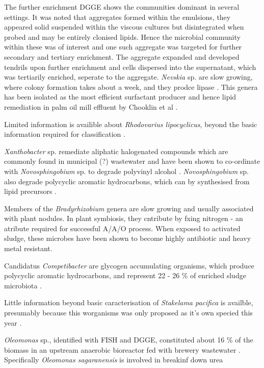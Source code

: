 \documentclass[11pt]{article}
\begin{document}
The further enrichment DGGE shows the communities dominant in several settings. It was noted that aggregates formed within the emulsions, they appeared solid suspended within the viscous cultures but disintegrated when probed and may be entirely clonised lipids. Hence the microbial community within these was of interest and one such aggregate was targeted for further secondary and tertiary enrichment. The aggregate expanded and developed tendrils upon further enrichment and    cells dispersed into the supernatant, which was tertiarily enriched, seperate to the aggregate.
\emph{Nevskia} sp. are slow growing, where colony formation takes about a week, and they prodce lipase \cite{kim2011nevskia}. This genera has been isolated as the most efficient surfactant producer and hence lipid remediation in palm oil mill effluent by Chooklin et al \cite{hooklinutilization}.



Limited information is availible about \emph{Rhodovarius lipocyclicus}, beyond the basic information required for classification \cite{kampfer2004rhodovarius}.

\emph{Xanthobacter} sp. remediate aliphatic halogenated compounds which are commonly found in municipal (?) wastewater \cite{janssen1985degradation} and have been shown to co-ordinate with \emph{Novosphingobium} sp. to degrade polyvinyl alcohol \cite{rong2009symbiotic}. \emph{Novosphingobium} sp. also degrade polycyclic aromatic hydrocarbons, which can by synthesised from lipid precursors \cite{addison2007novosphingobium}.

Members of the \emph{Bradyrhizobium} genera are slow growing \cite{rebah2002wastewater} and usually associated with plant nodules. In plant symbiosis, they cntribute by fxing nitrogen - an atribute required for successful A/A/O process. When exposed to activated sludge, these microbes have been shown to become highly antibiotic and heavy metal resistant.

Candidatus \emph{Competibacter} are glycogen accumulating organisms, which produce polycyclic aromatic hydrocarbons, and represent 22 - 26 \% of enriched sludge microbiota \cite{bengtsson2008production,lemaire2008microbial}. 

Little information beyond basic caracterisation of \emph{Stakelama pacifica} is availble, presumably because this worganisms was only proposed as it's own specied this year \cite{ogler2013description}.

\emph{Oleomonas} sp., identified with FISH and DGGE, constituted about 16 \% of the biomass in an upstream anaerobic bioreactor fed with brewery wastewater \cite{fernandez2008analysis}. Specifically \emph{Oleomonas sagaranensis} is involved in breakinf down urea \cite{kanamori2005allophanate,kanamori2004enzymatic}
\end{document}
